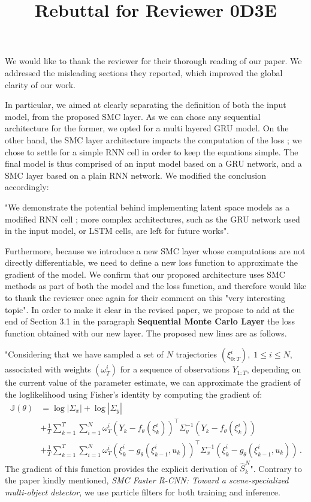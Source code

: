 \documentclass{article}
\title{Rebuttal for Reviewer 0D3E}
\date{}
\begin{document}

We would like to thank the reviewer for their thorough reading of our paper.
We addressed the misleading sections they reported, which improved the global clarity of our work.

In particular, we aimed at clearly separating the definition of both the input model, from the proposed SMC layer.
As we can chose any sequential architecture for the former, we opted for a multi layered GRU model.
On the other hand, the SMC layer architecture impacts the computation of the loss ; we chose to settle for a simple RNN cell in order to keep the equations simple.
The final model is thus comprised of an input model based on a GRU network, and a SMC layer based on a plain RNN network.
We modified the conclusion accordingly:

"We demonstrate the potential behind implementing latent space models as a modified RNN cell ; more complex architectures, such as the GRU network used in the input model, or LSTM cells, are left for future works".


Furthermore, because we introduce a new SMC layer whose computations are not directly differentiable, we need to define a new loss function to approximate the gradient of the model.
We confirm that our proposed architecture uses SMC methods as part of both the model and the loss function, and therefore would like to thank the reviewer once again for their comment on this "very interesting topic".
In order to make it clear in the revised paper, we propose to add at the end of Section 3.1 in the paragraph {\bf Sequential Monte Carlo Layer} the loss function obtained with our new layer. The proposed new lines are as follows.

"Considering that we have sampled a set of $N$ trajectories $(\xi^i_{0:T}),\;1 \leq i \leq N$, associated with weights $(\omega_T^i)$ for a sequence of observations $Y_{1:T}$, depending on the current value of the parameter estimate, we can approximate the gradient of the loglikelihood using Fisher's identity by computing the gradient of:
	\begin{align*}
		\mathbb{J}(\theta) & = \log |\Sigma_x| + \log |\Sigma_y|                                                                                                        \\
		                   & + \frac{1}{T}\sum_{k=1}^T \sum_{i=1}^N \omega_T^i (Y_k - f_\theta(\xi_k^i))^{\top} \Sigma_y^{-1} (Y_k - f_\theta(\xi_k^i))                         \\
		                   & + \frac{1}{T}\sum_{k=1}^T \sum_{i=1}^N \omega_T^i (\xi_k^i - g_\theta(\xi_{k-1}^i, u_k))^\top\Sigma_x^{-1}(\xi_k^i - g_\theta(\xi_{k-1}^i, u_k))\,.
	\end{align*}
The gradient of this function provides the explicit derivation of $\widehat{S}_k^N$".
Contrary to the paper kindly mentioned, \textit{SMC Faster R-CNN: Toward a scene-specialized multi-object detector}, we use particle filters for both training and inference.




\end{document}

